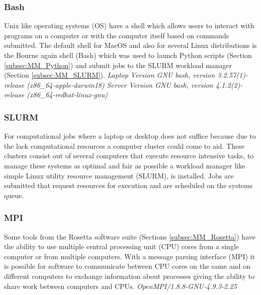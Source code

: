 \subsubsection{Bash}
Unix like operating systems (OS) have a shell which allows users to interact with programs on a computer or with the computer itself based on commands submitted.  The default shell for MacOS and also for several Linux distributions is the Bourne again shell (Bash) which was used to launch Python scripts (Section \ref{subsec:MM_Python}) and submit jobs to the SLURM workload manager (Section \ref{subsec:MM_SLURM}). 
\label{subsec:MM_Bash}
\newline
\textit{Laptop Version GNU bash, version 3.2.57(1)-release (x86\_64-apple-darwin18)}
\newline
\textit{Server Version GNU bash, version 4.1.2(2)-release (x86\_64-redhat-linux-gnu)}

\subsubsection{SLURM}
For computational jobs where a laptop or desktop does not suffice because due to the lack computational resources a computer cluster could come to aid.
These clusters consist out of several computers that execute resource intensive tasks, to manage these systems as optimal and fair as possible a workload manager like simple Linux utility resource management (SLURM), is installed. Jobs are submitted that request resources for execution and are scheduled on the systems queue.
\label{subsec:MM_SLURM}

\subsubsection{MPI}
Some tools from the Rosetta software suite (Sections \ref{subsec:MM_Rosetta}) have the ability to use multiple central processing unit (CPU) cores from a single computer or from multiple computers. With a message parsing interface (MPI) it is possible for software to communicate between CPU cores on the same and on different computers to exchange information about processes giving the ability to share work between computers and CPUs.
\label{subsec:MM_MPI}
\newline
\textit{OpenMPI/1.8.8-GNU-4.9.3-2.25}
\newline



